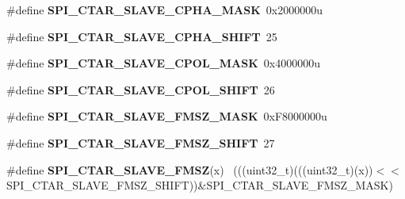 \begin{DoxyCompactItemize}
\item 
\hypertarget{group___s_p_i___register___masks_ga3e8aa9f143abc35fcb9f86e5de378621}{}\#define {\bfseries S\+P\+I\+\_\+\+C\+T\+A\+R\+\_\+\+S\+L\+A\+V\+E\+\_\+\+C\+P\+H\+A\+\_\+\+M\+A\+S\+K}~0x2000000u\label{group___s_p_i___register___masks_ga3e8aa9f143abc35fcb9f86e5de378621}

\item 
\hypertarget{group___s_p_i___register___masks_ga6470631f0d2f0d7722ab55a1f97c936e}{}\#define {\bfseries S\+P\+I\+\_\+\+C\+T\+A\+R\+\_\+\+S\+L\+A\+V\+E\+\_\+\+C\+P\+H\+A\+\_\+\+S\+H\+I\+F\+T}~25\label{group___s_p_i___register___masks_ga6470631f0d2f0d7722ab55a1f97c936e}

\item 
\hypertarget{group___s_p_i___register___masks_ga57c0bdc9ff5183b0e8da776a8d803ff1}{}\#define {\bfseries S\+P\+I\+\_\+\+C\+T\+A\+R\+\_\+\+S\+L\+A\+V\+E\+\_\+\+C\+P\+O\+L\+\_\+\+M\+A\+S\+K}~0x4000000u\label{group___s_p_i___register___masks_ga57c0bdc9ff5183b0e8da776a8d803ff1}

\item 
\hypertarget{group___s_p_i___register___masks_ga183134048ae879b82e3aa07b4a51d79d}{}\#define {\bfseries S\+P\+I\+\_\+\+C\+T\+A\+R\+\_\+\+S\+L\+A\+V\+E\+\_\+\+C\+P\+O\+L\+\_\+\+S\+H\+I\+F\+T}~26\label{group___s_p_i___register___masks_ga183134048ae879b82e3aa07b4a51d79d}

\item 
\hypertarget{group___s_p_i___register___masks_ga5230074b3809e2ef525e87fdca078717}{}\#define {\bfseries S\+P\+I\+\_\+\+C\+T\+A\+R\+\_\+\+S\+L\+A\+V\+E\+\_\+\+F\+M\+S\+Z\+\_\+\+M\+A\+S\+K}~0x\+F8000000u\label{group___s_p_i___register___masks_ga5230074b3809e2ef525e87fdca078717}

\item 
\hypertarget{group___s_p_i___register___masks_gaf8ee524100dedae1cc3afb60643b2475}{}\#define {\bfseries S\+P\+I\+\_\+\+C\+T\+A\+R\+\_\+\+S\+L\+A\+V\+E\+\_\+\+F\+M\+S\+Z\+\_\+\+S\+H\+I\+F\+T}~27\label{group___s_p_i___register___masks_gaf8ee524100dedae1cc3afb60643b2475}

\item 
\hypertarget{group___s_p_i___register___masks_ga5f6b2041d6342e35e47e90bffa08a0e0}{}\#define {\bfseries S\+P\+I\+\_\+\+C\+T\+A\+R\+\_\+\+S\+L\+A\+V\+E\+\_\+\+F\+M\+S\+Z}(x)                                  ~(((uint32\+\_\+t)(((uint32\+\_\+t)(x))$<$$<$S\+P\+I\+\_\+\+C\+T\+A\+R\+\_\+\+S\+L\+A\+V\+E\+\_\+\+F\+M\+S\+Z\+\_\+\+S\+H\+I\+F\+T))\&S\+P\+I\+\_\+\+C\+T\+A\+R\+\_\+\+S\+L\+A\+V\+E\+\_\+\+F\+M\+S\+Z\+\_\+\+M\+A\+S\+K)\label{group___s_p_i___register___masks_ga5f6b2041d6342e35e47e90bffa08a0e0}


\end{DoxyCompactItemize}
